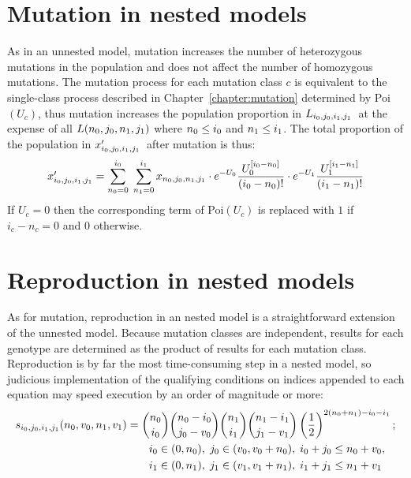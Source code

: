 \documentclass[12pt,twoside,letterpaper,fleqn]{report}
\numberwithin{equation}{section}  %
\newcommand{\ProbDist}[2]{\mbox{{#1}$(#2)$}}
\newcommand{\izero}{\mbox{$i_0$\/}}
\newcommand{\jzero}{\mbox{$j_0$\/}}
\newcommand{\ione}{\mbox{$i_1$\/}}
\newcommand{\jone}{\mbox{$j_1$\/}}
\newcommand{\nzero}{\mbox{$n_0$\/}}
\newcommand{\none}{\mbox{$n_1$\/}}
\newcommand{\Lijij}{\mbox{$L_{i_0\/,j_0\/,i_1\/,j_1\/}$}}
\newcommand{\xpijij}{\mbox{$x'_{i_0\/,j_0\/,i_1\/,j_1\/}$}}
\newcommand{\funcselfnested}{\mbox{$s_{i_0\/,j_0\/,i_1\/,j_1\/}(n_0\/,v_0\/,n_1\/,v_1\/)$}}
\begin{document}
{%
\section{Mutation in nested models}

As in an unnested model, mutation increases the number of heterozygous mutations in the population and does not affect the number of homozygous mutations.  The mutation process for each mutation class $c$ is equivalent to the single-class process described in Chapter~\ref{chapter:mutation} determined by \ProbDist{Poi}{U_c}, thus mutation increases the population proportion in \Lijij\ at the expense of all $L(\nzero,\jzero,\none,\jone)$ where $\nzero\le\izero$ and $\none\le\ione$.  The total proportion of the population in \xpijij\ after mutation is thus:
\begin{equation}\label{eq:nested:fullequation}
    \xpijij = \sum_{n_0=0}^{i_0}{\; \sum_{n_1=0}^{i_1}{x_{n_0,j_0,n_1,j_1} \cdot e^{-U_0} \frac{U_0^{[i_0-n_0]}}{(\izero-\nzero)!} \cdot e^{-U_1} \frac{U_1^{[i_1-n_1]}}{(\ione-\none)!}}}
\end{equation}
If $U_c=0$ then the corresponding term of \ProbDist{Poi}{U_c} is replaced with $1$ if $i_c-n_c=0$ and $0$ otherwise.
\section{Reproduction in nested models}

As for mutation, reproduction in an nested model is a straightforward extension of the unnested model.  Because mutation classes are independent, results for each genotype are determined as the product of results for each mutation class.  Reproduction is by far the most time-consuming step in a nested model, so judicious implementation of the qualifying conditions on indices appended to each equation may speed execution by an order of magnitude or more:
\begin{equation}
\label{eq:nested:s}
\begin{split}
  \funcselfnested &= \binom{n_0}{i_0}\binom{n_0-i_0}{j_0-v_0}\binom{n_1}{i_1}\binom{n_1-i_1}{j_1-v_1}\left({\frac{1}{2}}\right)^{2(n_0+n_1)-i_0-i_1} ; \\
  & \qquad i_0\in(0,n_0),\;j_0\in(v_0,v_0 + n_0),\;i_0+j_0 \leq n_0+v_0,\\
  & \qquad i_1\in(0,n_1),\;j_1\in(v_1,v_1 + n_1),\;i_1+j_1 \leq n_1+v_1 
\end{split}
\end{equation}

}
\end{document}
